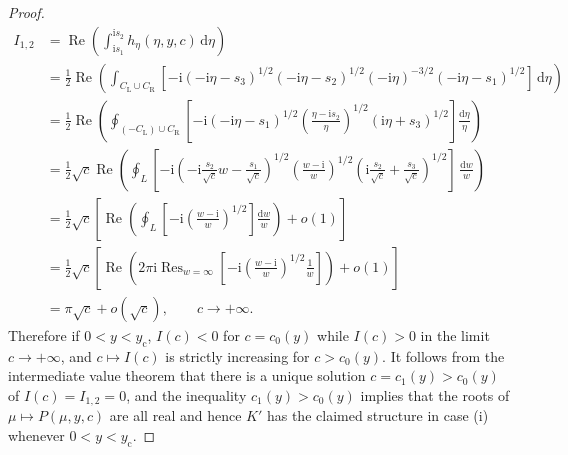 \documentclass[pdftex]{sigma}
\numberwithin{equation}{section}
\begin{document}
\begin{proof}
\begin{align*}
I_{1,2}&=\operatorname{Re}\left(\int_{\mathrm{i} s_1}^{\mathrm{i} s_2}h_\eta(\eta,y,c)\,\mathrm{d}\eta\right) \\ &=
\frac{1}{2}\operatorname{Re}\left(\int_{C_\mathrm{L}\cup C_\mathrm{R}}\left[-\mathrm{i}(-\mathrm{i}\eta-s_3)^{1/2}(-\mathrm{i}\eta-s_2)^{1/2}(-\mathrm{i}\eta)^{-3/2}(-\mathrm{i}\eta-s_1)^{1/2}\right]\,\mathrm{d}\eta\right)\\
&=\frac{1}{2}\operatorname{Re}\left(\oint_{(-C_\mathrm{L})\cup C_\mathrm{R}}\left[-\mathrm{i} (-\mathrm{i}\eta-s_1)^{1/2}\left(\frac{\eta-\mathrm{i} s_2}{\eta}\right)^{1/2}(\mathrm{i}\eta+s_3)^{1/2}\right]\frac{\mathrm{d}\eta}{\eta}\right)\\
&=\frac{1}{2}\sqrt{c}\operatorname{Re}\left(\oint_{L}\left[-\mathrm{i}\left(-\mathrm{i}\frac{s_2}{\sqrt{c}}w-\frac{s_1}{\sqrt{c}}\right)^{1/2}\left(\frac{w-\mathrm{i}}{w}\right)^{1/2}\left(\mathrm{i}\frac{s_2}{\sqrt{c}}+\frac{s_3}{\sqrt{c}}\right)^{1/2}\right]\,\frac{\mathrm{d} w}{w}\right)\\
&=\frac{1}{2}\sqrt{c}\left[\operatorname{Re}\left(\oint_L\left[-\mathrm{i}\left(\frac{w-\mathrm{i}}{w}\right)^{1/2}\right]\frac{\mathrm{d} w}{w}\right)+o(1)\right] \\ %
&=\frac{1}{2}\sqrt{c}\left[\operatorname{Re}\left(2\pi\mathrm{i}\mathop{\mathrm{Res}}_{w=\infty}
\left[-\mathrm{i}\left(\frac{w-\mathrm{i}}{w}\right)^{1/2}\frac{1}{w}\right]\right)+o(1)\right] \\ %
&=\pi\sqrt{c}+o(\sqrt{c}),\qquad c\to+\infty.
\end{align*}
Therefore if $0<y<y_\mathrm{c}$, $I(c)<0$ for $c=c_0(y)$ while $I(c)>0$ in the limit $c\to+\infty$, and $c\mapsto I(c)$ is strictly increasing for $c>c_0(y)$. It follows from the intermediate value theorem that there is a unique solution $c=c_1(y)>c_0(y)$ of $I(c)=I_{1,2}=0$, and the inequality $c_1(y)>c_0(y)$ implies that the roots of $\mu\mapsto P(\mu,y,c)$ are all real and hence $K'$ has the claimed structure in case (i) whenever $0<y<y_\mathrm{c}$.


\end{proof}
\end{document}

